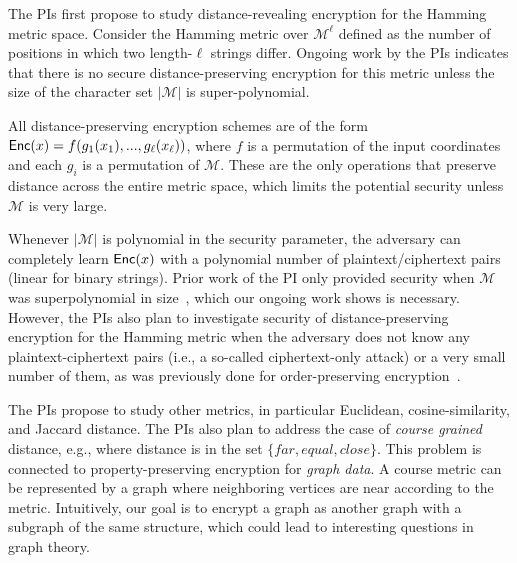 The PIs first propose to study distance-revealing encryption for the Hamming metric space.
Consider the Hamming metric over $\mathcal{M}^\ell$ defined as
the number of positions in which two length-$\ell$ strings differ.
Ongoing work by the PIs indicates that there is no secure
distance-preserving encryption for this metric unless the size of the
character set $|\mathcal{M}|$ is
super-polynomial.

All distance-preserving encryption schemes
are of the form $\mathsf{Enc}(x) =
f(g_1(x_1),..., g_\ell(x_\ell))$, where $f$ is a permutation of the
input coordinates and each $g_i$ is a permutation of $\mathcal{M}$.
These are the only
operations that preserve distance across the entire metric space, which
limits the potential security unless $\mathcal{M}$ is very large.

Whenever $|\mathcal{M}|$ is polynomial in the security parameter, the adversary can completely learn $\mathsf{Enc}(x)$ with a polynomial number of plaintext/ciphertext pairs (linear for binary strings).  Prior work of the PI only provided security when $\mathcal{M}$ was superpolynomial in size~\cite{EPRINT:ABCFG16}, which our ongoing work shows is necessary.  However, the PIs also plan to investigate security of distance-preserving encryption for the Hamming metric when the adversary does not know any plaintext-ciphertext pairs (i.e., a so-called ciphertext-only attack) or a very small number of them, as was previously done for order-preserving encryption~\cite{C:BolCheONe11}.
 
 The PIs propose to study other metrics, in particular Euclidean,
 cosine-similarity, and Jaccard distance.    The PIs also plan to
 address the case of \emph{course grained} distance, e.g., where
 distance is in the set $\{far, equal, close\}$.  This problem is
 connected to property-preserving encryption for \emph{graph data}.  A
 course metric can be represented by a graph where neighboring vertices
 are near according to the metric.  Intuitively, our goal is to encrypt
 a graph as another graph with a subgraph of the same structure,
 which could lead to interesting questions in graph theory.

